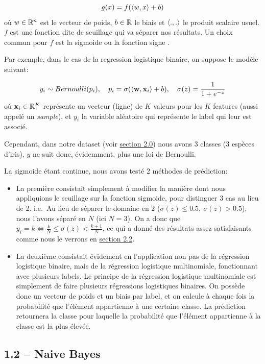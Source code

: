 \documentclass[
]{article}
\providecommand{\tightlist}{%
  \setlength{\itemsep}{0pt}\setlength{\parskip}{0pt}}
\begin{document}
\[
g(x) = f(\langle w, x \rangle + b)
\] où \(w \in \mathbb{R}^n\) est le vecteur de poids, \(b \in \mathbb{R}\) le biais et
\(\langle ., . \rangle\) le produit scalaire usuel. \(f\) est une fonction
dite de seuillage qui va séparer nos résultats. Un choix commun pour
\(f\) est la sigmoide ou la fonction signe
\cite{ClassifieurLineaire2022}.

Par exemple, dans le cas de la regression logistique binaire, on suppose
le modèle suivant:

\[
y_i \sim Bernoulli(p_i),\quad p_i = \sigma(\langle \mathbf{w}, \mathbf{x}_i \rangle + b),\quad \sigma(z) = \frac{1}{1 + e^{-z}}
\] où \(\mathbf{x}_i \in \mathbb{R}^K\) représente un vecteur (ligne) de \(K\)
valeurs pour les \(K\) features (aussi appelé un \emph{sample}), et
\(y_i\) la variable aléatoire qui représente le label qui leur est
associé.

Cependant, dans notre dataset (voir
\href{#choix-du-dataset-outils-utilisuxe9s}{section 2.0}) nous avons 3
classes (3 espèces d'iris), \(y\) ne suit donc, évidemment, plus une loi
de Bernoulli.

La sigmoide étant continue, nous avons testé 2 méthodes de prédiction:

\begin{itemize}
\tightlist
\item
  La première consistait simplement à modifier la manière dont nous
  appliquions le seuillage sur la fonction sigmoide, pour distinguer 3
  cas au lieu de 2. i.e.~Au lieu de séparer le domaine en 2
  (\(\sigma(z) \leq 0.5,\ \sigma(z) > 0.5\)), nous l'avons séparé en
  \(N\) (ici \(N = 3\)). On a donc que
  \(y_i = k \Leftrightarrow \frac{k}{N} \leq \sigma(z) < \frac{k + 1}{N}\),
  ce qui a donné des résultats assez satisfaisants comme nous le verrons
  en \href{#ruxe9gression-logistique-1}{section 2.2}.
\item
  La deuxième consistait évidement en l'application non pas de la
  régression logistique binaire, mais de la régression logistique
  multinomiale, fonctionnant avec plusieurs labels. Le principe de la
  régression logistique multinomiale est simplement de faire plusieurs
  régressions logistiques binaires. On possède donc un vecteur de poids
  et un biais par label, et on calcule à chaque fois la probabilité que
  l'élément appartienne à une certaine classe. La prédiction retournera
  la classe pour laquelle la probabilité que l'élément appartienne à la
  classe est la plus élevée.
\end{itemize}

\hypertarget{naive-bayes}{%
\subsection{1.2 -- Naive Bayes}\label{naive-bayes}}
\end{document}
